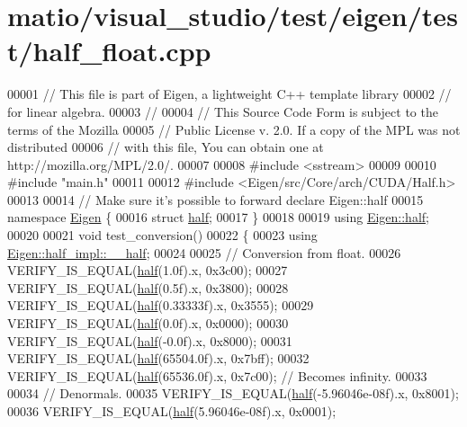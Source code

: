 \hypertarget{matio_2visual__studio_2test_2eigen_2test_2half__float_8cpp_source}{}\section{matio/visual\+\_\+studio/test/eigen/test/half\+\_\+float.cpp}
\label{matio_2visual__studio_2test_2eigen_2test_2half__float_8cpp_source}

\begin{DoxyCode}
00001 \textcolor{comment}{// This file is part of Eigen, a lightweight C++ template library}
00002 \textcolor{comment}{// for linear algebra.}
00003 \textcolor{comment}{//}
00004 \textcolor{comment}{// This Source Code Form is subject to the terms of the Mozilla}
00005 \textcolor{comment}{// Public License v. 2.0. If a copy of the MPL was not distributed}
00006 \textcolor{comment}{// with this file, You can obtain one at http://mozilla.org/MPL/2.0/.}
00007 
00008 \textcolor{preprocessor}{#include <sstream>}
00009 
00010 \textcolor{preprocessor}{#include "main.h"}
00011 
00012 \textcolor{preprocessor}{#include <Eigen/src/Core/arch/CUDA/Half.h>}
00013 
00014 \textcolor{comment}{// Make sure it's possible to forward declare Eigen::half}
00015 \textcolor{keyword}{namespace }\hyperlink{namespace_eigen}{Eigen} \{
00016 \textcolor{keyword}{struct }\hyperlink{struct_eigen_1_1half}{half};
00017 \}
00018 
00019 \textcolor{keyword}{using} \hyperlink{struct_eigen_1_1half}{Eigen::half};
00020 
00021 \textcolor{keywordtype}{void} test\_conversion()
00022 \{
00023   \textcolor{keyword}{using} \hyperlink{struct_eigen_1_1half__impl_1_1____half}{Eigen::half\_impl::\_\_half};
00024 
00025   \textcolor{comment}{// Conversion from float.}
00026   VERIFY\_IS\_EQUAL(\hyperlink{struct_eigen_1_1half}{half}(1.0f).x, 0x3c00);
00027   VERIFY\_IS\_EQUAL(\hyperlink{struct_eigen_1_1half}{half}(0.5f).x, 0x3800);
00028   VERIFY\_IS\_EQUAL(\hyperlink{struct_eigen_1_1half}{half}(0.33333f).x, 0x3555);
00029   VERIFY\_IS\_EQUAL(\hyperlink{struct_eigen_1_1half}{half}(0.0f).x, 0x0000);
00030   VERIFY\_IS\_EQUAL(\hyperlink{struct_eigen_1_1half}{half}(-0.0f).x, 0x8000);
00031   VERIFY\_IS\_EQUAL(\hyperlink{struct_eigen_1_1half}{half}(65504.0f).x, 0x7bff);
00032   VERIFY\_IS\_EQUAL(\hyperlink{struct_eigen_1_1half}{half}(65536.0f).x, 0x7c00);  \textcolor{comment}{// Becomes infinity.}
00033 
00034   \textcolor{comment}{// Denormals.}
00035   VERIFY\_IS\_EQUAL(\hyperlink{struct_eigen_1_1half}{half}(-5.96046e-08f).x, 0x8001);
00036   VERIFY\_IS\_EQUAL(\hyperlink{struct_eigen_1_1half}{half}(5.96046e-08f).x, 0x0001);

\end{DoxyCode}
